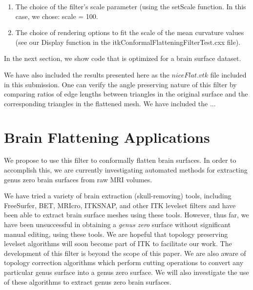 \documentclass{InsightArticle}
\begin{document}
  \begin{enumerate}
  \item The choice of the filter's scale parameter (using the setScale
  function. In this case, we chose: scale = 100.
  \item The choice of rendering options to fit the scale of the mean
  curvature values (see our Display function in the
  itkConformalFlatteningFilterTest.cxx file).
  \end{enumerate}

  \noindent In the next section, we show code that is
  optimized for a brain surface dataset.

  We have also included the results presented here as the
  $niceFlat.vtk$ file included in this submission. One can verify the
  angle preserving nature of this filter by comparing ratios of edge
  lengths between triangles in the original surface and the
  corresponding triangles in the flattened mesh. We have included the
  ...

	\section{Brain Flattening Applications}
  We propose to use this filter to conformally flatten brain
  surfaces. In order to accomplish this, we are currently
  investigating automated methods for extracting genus zero brain
  surfaces from raw MRI volumes.

  We have tried a variety of brain extraction (skull-removing) tools,
  including FreeSurfer, BET, MRIcro, ITKSNAP, and other ITK levelset
  filters and have been able to extract brain surface meshes using
  these tools. However, thus far, we have been unsuccessful in
  obtaining a \emph{genus zero} surface without significant manual
  editing, using these tools. We are hopeful that topology preserving
  levelset algorithms will soon become part of ITK to facilitate our
  work. The development of this filter is beyond the scope of this
  paper. We are also aware of topology correction algorithms which
  perform cutting operations to convert any particular genus surface
  into a genus zero surface. We will also investigate the use of these
  algorithms to extract genus zero brain surfaces.
\end{document}
